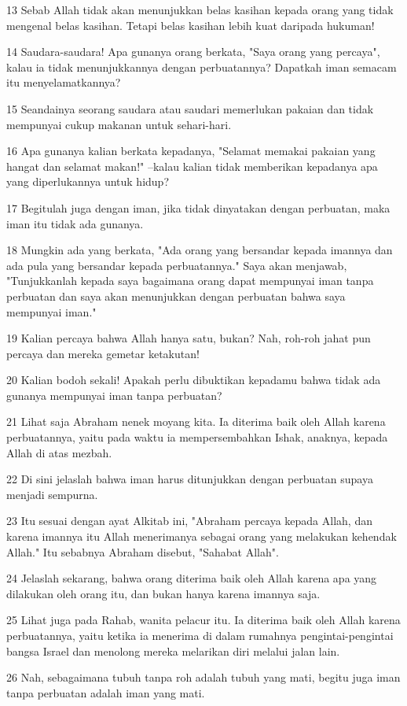 \par 13 Sebab Allah tidak akan menunjukkan belas kasihan kepada orang yang tidak mengenal belas kasihan. Tetapi belas kasihan lebih kuat daripada hukuman!
\par 14 Saudara-saudara! Apa gunanya orang berkata, "Saya orang yang percaya", kalau ia tidak menunjukkannya dengan perbuatannya? Dapatkah iman semacam itu menyelamatkannya?
\par 15 Seandainya seorang saudara atau saudari memerlukan pakaian dan tidak mempunyai cukup makanan untuk sehari-hari.
\par 16 Apa gunanya kalian berkata kepadanya, "Selamat memakai pakaian yang hangat dan selamat makan!" --kalau kalian tidak memberikan kepadanya apa yang diperlukannya untuk hidup?
\par 17 Begitulah juga dengan iman, jika tidak dinyatakan dengan perbuatan, maka iman itu tidak ada gunanya.
\par 18 Mungkin ada yang berkata, "Ada orang yang bersandar kepada imannya dan ada pula yang bersandar kepada perbuatannya." Saya akan menjawab, "Tunjukkanlah kepada saya bagaimana orang dapat mempunyai iman tanpa perbuatan dan saya akan menunjukkan dengan perbuatan bahwa saya mempunyai iman."
\par 19 Kalian percaya bahwa Allah hanya satu, bukan? Nah, roh-roh jahat pun percaya dan mereka gemetar ketakutan!
\par 20 Kalian bodoh sekali! Apakah perlu dibuktikan kepadamu bahwa tidak ada gunanya mempunyai iman tanpa perbuatan?
\par 21 Lihat saja Abraham nenek moyang kita. Ia diterima baik oleh Allah karena perbuatannya, yaitu pada waktu ia mempersembahkan Ishak, anaknya, kepada Allah di atas mezbah.
\par 22 Di sini jelaslah bahwa iman harus ditunjukkan dengan perbuatan supaya menjadi sempurna.
\par 23 Itu sesuai dengan ayat Alkitab ini, "Abraham percaya kepada Allah, dan karena imannya itu Allah menerimanya sebagai orang yang melakukan kehendak Allah." Itu sebabnya Abraham disebut, "Sahabat Allah".
\par 24 Jelaslah sekarang, bahwa orang diterima baik oleh Allah karena apa yang dilakukan oleh orang itu, dan bukan hanya karena imannya saja.
\par 25 Lihat juga pada Rahab, wanita pelacur itu. Ia diterima baik oleh Allah karena perbuatannya, yaitu ketika ia menerima di dalam rumahnya pengintai-pengintai bangsa Israel dan menolong mereka melarikan diri melalui jalan lain.
\par 26 Nah, sebagaimana tubuh tanpa roh adalah tubuh yang mati, begitu juga iman tanpa perbuatan adalah iman yang mati.

